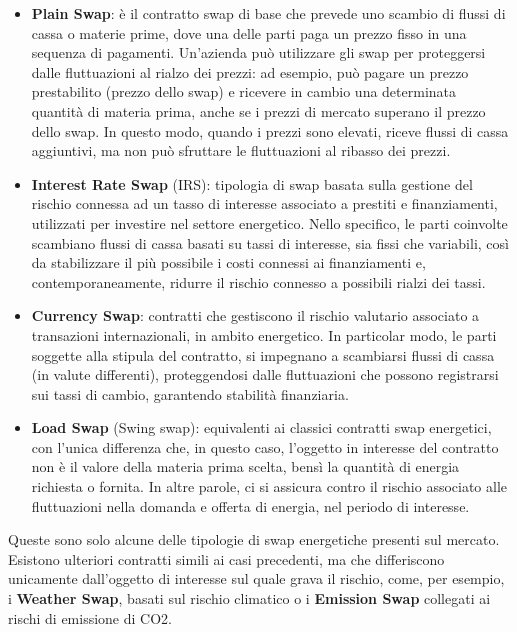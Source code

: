 \documentclass[12pt,a4paper]{report}
\begin{document}
\begin{itemize}
    \item \textbf{Plain Swap}: è il contratto swap di base che prevede uno scambio di flussi di cassa o materie prime, dove una delle parti paga un prezzo fisso in una sequenza di pagamenti. Un'azienda può utilizzare gli swap per proteggersi dalle fluttuazioni al rialzo dei prezzi: ad esempio, può pagare un prezzo prestabilito (prezzo dello swap) e ricevere in cambio una determinata quantità di materia prima, anche se i prezzi di mercato superano il prezzo dello swap. In questo modo, quando i prezzi sono elevati, riceve flussi di cassa aggiuntivi, ma non può sfruttare le fluttuazioni al ribasso dei prezzi.
    \item \textbf{Interest Rate Swap} (IRS): tipologia di swap basata sulla gestione del rischio connessa ad un tasso di interesse associato a prestiti e finanziamenti, utilizzati per investire nel settore energetico. Nello specifico, le parti coinvolte scambiano flussi di cassa basati su tassi di interesse, sia fissi che variabili, così da stabilizzare il più possibile i costi connessi ai finanziamenti e, contemporaneamente, ridurre il rischio connesso a possibili rialzi dei tassi.
    \item \textbf{Currency Swap}: contratti che gestiscono il rischio valutario associato a transazioni internazionali, in ambito energetico. In particolar modo, le parti soggette alla stipula del contratto, si impegnano a scambiarsi flussi di cassa (in valute differenti), proteggendosi dalle fluttuazioni che possono registrarsi sui tassi di cambio, garantendo stabilità finanziaria.
    \item \textbf{Load Swap} (Swing swap): equivalenti ai classici contratti swap energetici, con l'unica differenza che, in questo caso, l'oggetto in interesse del contratto non è il valore della materia prima scelta, bensì la quantità di energia richiesta o fornita. In altre parole, ci si assicura contro il rischio associato alle fluttuazioni nella domanda e offerta di energia, nel periodo di interesse.     
\end{itemize}

Queste sono solo alcune delle tipologie di swap energetiche presenti sul mercato. Esistono ulteriori contratti simili ai casi precedenti, ma che differiscono unicamente dall'oggetto di interesse sul quale grava il rischio, come, per esempio, i \textbf{Weather Swap}, basati sul rischio climatico o i \textbf{Emission Swap} collegati ai rischi di emissione di CO2.
\end{document}
